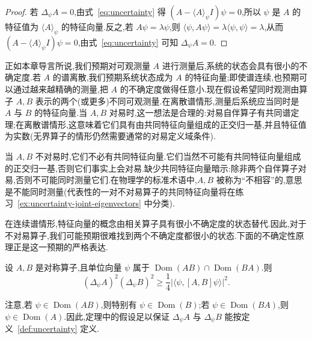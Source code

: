 \begin{proof}
若 $\Delta_\psi A=0$,由式~\eqref{eq:uncertainty} 得
$(A-\langle A\rangle_\psi I)\psi=0$,所以 $\psi$ 是 $A$ 的特征值为 $\langle A\rangle_\psi$ 的特征向量.反之,若 $A\psi=\lambda\psi$,则
$\langle\psi,A\psi\rangle=\lambda\langle\psi,\psi\rangle=\lambda$,从而 $(A-\langle A\rangle_\psi I)\psi=0$,由式~\eqref{eq:uncertainty} 可知 $\Delta_\psi A=0$.
\end{proof}

正如本章导言所说,我们预期对可观测量 $A$ 进行测量后,系统的状态会具有很小的不确定度.若 $A$ 的谱离散,我们预期系统状态成为 $A$ 的特征向量;即使谱连续,也预期可以通过越来越精确的测量,把 $A$ 的不确定度做得任意小.现在假设希望同时观测由算子 $A,B$ 表示的两个(或更多)不同可观测量.在离散谱情形,测量后系统应当同时是 $A$ 与 $B$ 的特征向量.当 $A,B$ 对易时,这一想法是合理的:对易自伴算子有共同谱定理;在离散谱情形,这意味着它们具有由共同特征向量组成的正交归一基,并且特征值为实数(无界算子的情形仍然需要通常的对易定义域条件).

当 $A,B$ 不对易时,它们不必有共同特征向量.它们当然不可能有共同特征向量组成的正交归一基,否则它们事实上会对易.缺少共同特征向量暗示:除非两个自伴算子对易,否则不可能同时测量它们.在物理学的标准术语中,$A,B$ 被称为“不相容”的,意思是不能同时测量(代表性的一对不对易算子的共同特征向量将在练习~\ref{ex:uncertainty-joint-eigenvectors} 中分类).

在连续谱情形,特征向量的概念由相关算子具有很小不确定度的状态替代.因此,对于不对易算子,我们可能预期很难找到两个不确定度都很小的状态.下面的不确定性原理正是这一预期的严格表达.

\begin{theorem}[一般不确定性原理]\label{thm:uncertainty-general}
设 $A,B$ 是对称算子,且单位向量 $\psi$ 属于 $\operatorname{Dom}(AB)\cap\operatorname{Dom}(BA)$.则
\[
(\Delta_\psi A)^2(\Delta_\psi B)^2
\geq \frac14\left|\langle\psi,[A,B]\psi\rangle\right|^2.
\label{eq:uncertainty-general}
\]
\end{theorem}

注意,若 $\psi\in\operatorname{Dom}(AB)$,则特别有 $\psi\in\operatorname{Dom}(B)$;若 $\psi\in\operatorname{Dom}(BA)$,则 $\psi\in\operatorname{Dom}(A)$.因此,定理中的假设足以保证 $\Delta_\psi A$ 与 $\Delta_\psi B$ 能按定义~\ref{def:uncertainty} 定义.

